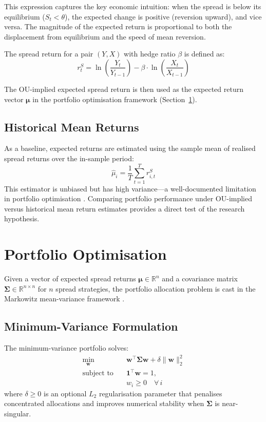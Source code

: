 \documentclass[a4paper]{report}
\begin{document}
This expression captures the key economic intuition: when the spread is below its equilibrium ($S_t < \theta$), the expected change is positive (reversion upward), and vice versa. The magnitude of the expected return is proportional to both the displacement from equilibrium and the speed of mean reversion.

The spread return for a pair $(Y, X)$ with hedge ratio $\beta$ is defined as:
\begin{equation}
r_t^{S} = \ln\!\left(\frac{Y_t}{Y_{t-1}}\right) - \beta \cdot \ln\!\left(\frac{X_t}{X_{t-1}}\right)
\label{eq:spread_return}
\end{equation}

The OU-implied expected spread return is then used as the expected return vector $\boldsymbol{\mu}$ in the portfolio optimisation framework (Section~\ref{sec:portfolio_opt}).

\subsection{Historical Mean Returns}

As a baseline, expected returns are estimated using the sample mean of realised spread returns over the in-sample period:
\begin{equation}
\hat{\mu}_i = \frac{1}{T}\sum_{t=1}^{T} r_{i,t}^{S}
\label{eq:hist_mean}
\end{equation}
This estimator is unbiased but has high variance---a well-documented limitation in portfolio optimisation \cite{merton1980}. Comparing portfolio performance under OU-implied versus historical mean return estimates provides a direct test of the research hypothesis.

\section{Portfolio Optimisation}
\label{sec:portfolio_opt}

Given a vector of expected spread returns $\boldsymbol{\mu} \in \mathbb{R}^n$ and a covariance matrix $\boldsymbol{\Sigma} \in \mathbb{R}^{n \times n}$ for $n$ spread strategies, the portfolio allocation problem is cast in the Markowitz mean-variance framework \cite{markowitz1959}.

\subsection{Minimum-Variance Formulation}

The minimum-variance portfolio solves:
\begin{equation}
\begin{aligned}
\min_{\mathbf{w}} \quad & \mathbf{w}^\top \boldsymbol{\Sigma} \mathbf{w} + \delta \|\mathbf{w}\|_2^2 \\
\text{subject to} \quad & \mathbf{1}^\top \mathbf{w} = 1, \\
& w_i \geq 0 \quad \forall\, i
\end{aligned}
\label{eq:min_var}
\end{equation}
where $\delta \geq 0$ is an optional $L_2$ regularisation parameter that penalises concentrated allocations and improves numerical stability when $\boldsymbol{\Sigma}$ is near-singular.
\end{document}
